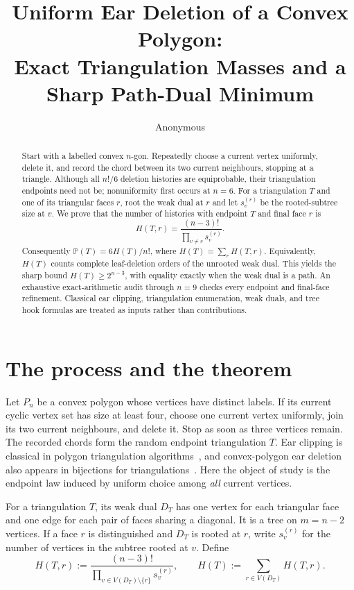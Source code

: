 \documentclass[a4paper,10pt]{amsart}
\title[Uniform ear deletion]{Uniform Ear Deletion of a Convex Polygon:\\
Exact Triangulation Masses and a Sharp Path-Dual Minimum}
\author{Anonymous}
\date{}
\theoremstyle{remark}
\newcommand{\Prob}{\mathbb P}
\begin{document}
\begin{abstract}
Start with a labelled convex $n$-gon.  Repeatedly choose a current vertex
uniformly, delete it, and record the chord between its two current
neighbours, stopping at a triangle.  Although all $n!/6$ deletion histories
are equiprobable, their triangulation endpoints need not be; nonuniformity
first occurs at $n=6$.  For a triangulation
$T$ and one of its triangular faces $r$, root the weak dual at $r$ and let
$s_v^{(r)}$ be the rooted-subtree size at $v$.  We prove that the number of
histories with endpoint $T$ and final face $r$ is
\[
  H(T,r)=\frac{(n-3)!}{\prod_{v\ne r}s_v^{(r)}}.
\]
Consequently $\Prob(T)=6H(T)/n!$, where $H(T)=\sum_r H(T,r)$.
Equivalently, $H(T)$ counts complete leaf-deletion orders of the unrooted
weak dual.  This yields the sharp bound $H(T)\ge 2^{n-3}$, with equality
exactly when the weak dual is a path.  An exhaustive exact-arithmetic audit
through $n=9$ checks every endpoint and final-face refinement.  Classical ear
clipping, triangulation enumeration, weak duals, and tree hook formulas are
treated as inputs rather than contributions.
\end{abstract}

\maketitle

\section{The process and the theorem}

Let $P_n$ be a convex polygon whose vertices have distinct labels.  If its
current cyclic vertex set has size at least four, choose one current vertex
uniformly, join its two current neighbours, and delete it.  Stop as soon as
three vertices remain.  The recorded chords form the random endpoint
triangulation $T$.  Ear clipping is classical in polygon triangulation
algorithms~\cite{EderHeldPalfrader2018}, and convex-polygon ear deletion also
appears in bijections for triangulations~\cite{Regev2013}.  Here the object of
study is the endpoint law induced by uniform choice among \emph{all} current
vertices.

For a triangulation $T$, its weak dual $D_T$ has one vertex for each triangular
face and one edge for each pair of faces sharing a diagonal.  It is a tree on
$m=n-2$ vertices.  If a face $r$ is distinguished and $D_T$ is rooted at $r$,
write $s_v^{(r)}$ for the number of vertices in the subtree rooted at $v$.
Define
\begin{equation}\label{eq:root-hook}
 H(T,r):=\frac{(n-3)!}{\prod_{v\in V(D_T)\setminus\{r\}}s_v^{(r)}},
 \qquad H(T):=\sum_{r\in V(D_T)}H(T,r).
\end{equation}
\end{document}
